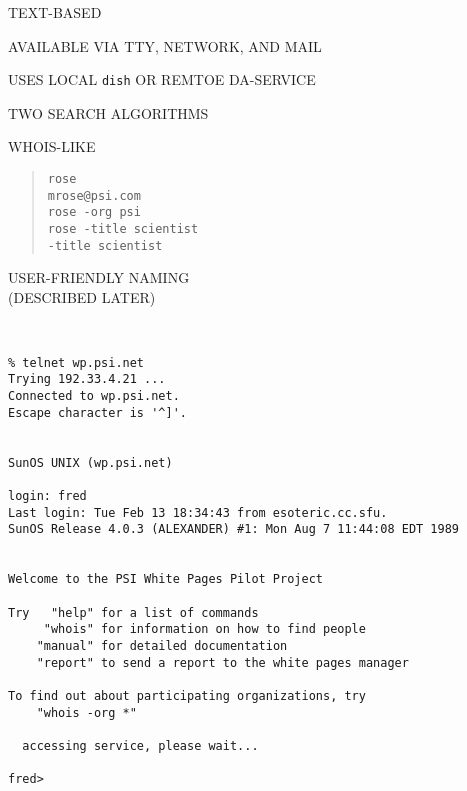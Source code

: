\begin{bwslide}

\begin{nrtc}
\item	TEXT-BASED
    \begin{nrtc}
    \item	AVAILABLE VIA TTY, NETWORK, AND MAIL
    \end{nrtc}

\item	USES LOCAL \verb"dish" OR REMTOE DA-SERVICE

\item	TWO SEARCH ALGORITHMS
    \begin{nrtc}
    \item	WHOIS-LIKE
\begin{quote}\small\begin{verbatim}
rose
mrose@psi.com
rose -org psi
rose -title scientist
-title scientist
\end{verbatim}\end{quote}

    \item	USER-FRIENDLY NAMING\\
		(DESCRIBED LATER)
    \end{nrtc}
\end{nrtc}
\end{bwslide}


\begin{bwslide}

\smaller
\begin{verbatim}


% telnet wp.psi.net
Trying 192.33.4.21 ...
Connected to wp.psi.net.
Escape character is '^]'.


SunOS UNIX (wp.psi.net)

login: fred
Last login: Tue Feb 13 18:34:43 from esoteric.cc.sfu.
SunOS Release 4.0.3 (ALEXANDER) #1: Mon Aug 7 11:44:08 EDT 1989


Welcome to the PSI White Pages Pilot Project

Try   "help" for a list of commands
     "whois" for information on how to find people
    "manual" for detailed documentation
    "report" to send a report to the white pages manager

To find out about participating organizations, try
    "whois -org *"

  accessing service, please wait...

fred>
\end{verbatim}
\end{bwslide}


